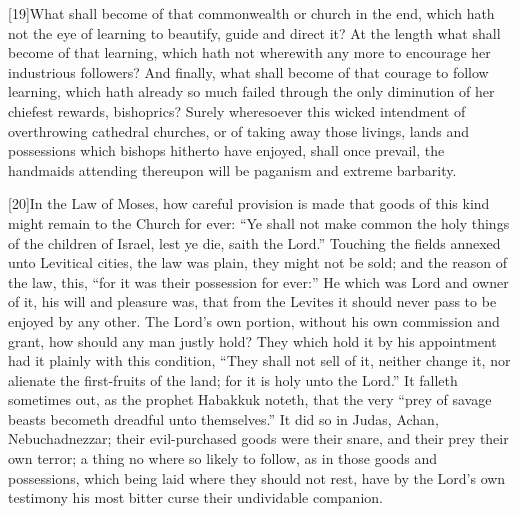 [19]What shall become of that commonwealth or church in the end, which hath not the eye of learning to beautify, guide and direct it? At the length what shall become of that learning, which hath not wherewith any more to encourage her industrious followers? And finally, what shall become of that courage to follow learning, which hath already so much failed through the only diminution of her chiefest rewards, bishoprics? Surely wheresoever this wicked intendment of overthrowing cathedral churches, or of taking away those livings, lands and possessions which bishops hitherto have enjoyed, shall once prevail, the handmaids attending thereupon will be paganism and extreme barbarity.

[20]In the Law of Moses, how careful provision is made  that goods of this kind might remain to the Church for ever: “Ye shall not make common the holy things of the children of Israel, lest ye die, saith the Lord.” Touching the fields annexed unto Levitical cities, the law was plain, they might not be sold; and the reason of the law, this, “for it was their possession for ever:” He which was Lord and owner of it, his will and pleasure was, that from the Levites it should never pass to be enjoyed by any other. The Lord’s own portion, without his own commission and grant, how should any man justly hold? They which hold it by his appointment had it plainly with this condition, “They shall not sell of it, neither change it, nor alienate the first-fruits of the land; for it is holy unto the Lord.” It falleth sometimes out, as the prophet Habakkuk noteth, that the very “prey of savage beasts becometh dreadful unto themselves.” It did so in Judas, Achan, Nebuchadnezzar; their evil-purchased goods were their snare, and their prey their own terror; a thing no where so likely to follow, as in those goods and possessions, which being laid where they should not rest, have by the Lord’s own testimony his most bitter curse their undividable companion.

